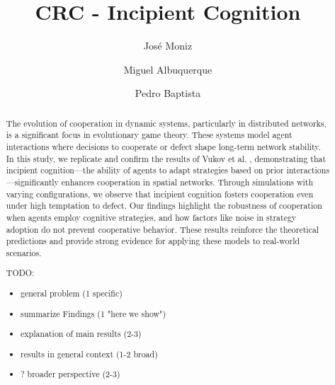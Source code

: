 \documentclass[runningheads]{llncs}
\begin{document}
%
\title{CRC - Incipient Cognition}


%
%
\author{José Moniz \and Miguel Albuquerque \and
Pedro Baptista}


%
\maketitle              %
%



\begin{abstract}
The evolution of cooperation in dynamic systems, particularly in distributed networks,
is a significant focus in evolutionary game theory. These systems model agent
interactions where decisions to cooperate or defect shape long-term network stability.
In this study, we replicate and confirm the results of Vukov et al. \cite{vukov},
demonstrating that incipient cognition—the ability of agents to adapt
strategies based on prior interactions—significantly enhances cooperation in spatial networks.
Through simulations with varying configurations, we observe that incipient cognition fosters
cooperation even under high temptation to defect. Our findings highlight the
robustness of cooperation when agents employ cognitive strategies, and how factors
like noise in strategy adoption do not prevent cooperative behavior.
These results reinforce the theoretical predictions and provide strong evidence
for applying these models to real-world scenarios.

TODO:
\begin{itemize}
    \item general problem (1 specific)
    \item summarize Findings (1 "here we show")
    \item explanation of main results (2-3)
    \item results in general context (1-2 broad)
    \item ? broader perspective (2-3)
\end{itemize}

\end{abstract}
\end{document}
